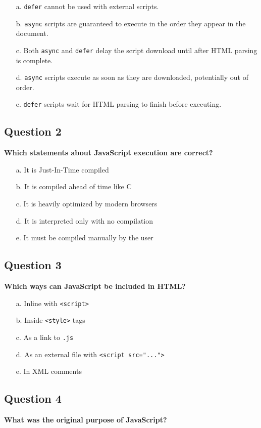 \documentclass{article}
\begin{document}
\begin{itemize}
  \item[a.] \texttt{defer} cannot be used with external scripts.
  \item[b.] \texttt{async} scripts are guaranteed to execute in the order they appear in the document.
  \item[c.] Both \texttt{async} and \texttt{defer} delay the script download until after HTML parsing is complete.
  \item[d.] \texttt{async} scripts execute as soon as they are downloaded, potentially out of order.
  \item[e.] \texttt{defer} scripts wait for HTML parsing to finish before executing.
\end{itemize}

\subsection*{Question 2}
\textbf{Which statements about JavaScript execution are correct?}

\begin{itemize}
  \item[a.] It is Just-In-Time compiled
  \item[b.] It is compiled ahead of time like C
  \item[c.] It is heavily optimized by modern browsers
  \item[d.] It is interpreted only with no compilation
  \item[e.] It must be compiled manually by the user
\end{itemize}

\subsection*{Question 3}
\textbf{Which ways can JavaScript be included in HTML?}

\begin{itemize}
  \item[a.] Inline with \texttt{<script>}
  \item[b.] Inside \texttt{<style>} tags
  \item[c.] As a link to \texttt{.js}
  \item[d.] As an external file with \texttt{<script src="...">}
  \item[e.] In XML comments
\end{itemize}

\subsection*{Question 4}
\textbf{What was the original purpose of JavaScript?}
\end{document}
